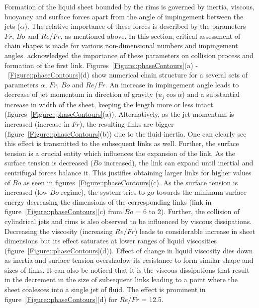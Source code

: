 \documentclass[%
 aip,
 sd,%
amsmath,amssymb,
preprint,%
author-year,%
]{revtex4-1}
\begin{document}
Formation of the liquid sheet bounded by the rims is governed by inertia, viscous, buoyancy and surface forces apart from the angle of impingement between the jets ($\alpha$). {\color{red}The relative importance of these forces is described by the parameters $Fr$, $Bo$ and $Re/Fr$, as mentioned above.} In this section, critical assessment of chain shapes is {\color{red}made} for various non-dimensional numbers and impingement angles. \cite{yang2014liquid} acknowledged the importance {\color{red}of these parameters on collision process and formation of the first link. Figures~\ref{Figure::phaseContours}(a) -~\ref{Figure::phaseContours}(d) show numerical chain structure for a several sets of parameters $\alpha$, $Fr$, $Bo$ and $Re/Fr$.} An increase in impingement angle leads to {\color{red}decrease of} jet momentum in direction of gravity ($u_j\cos\alpha$) {\color{red}and a substantial increase in width of the sheet, keeping the length more or less intact (figures~\ref{Figure::phaseContours}(a)).} Alternatively, as the jet momentum is increased (increase in $Fr$), {\color{red}the resulting links are bigger (figure~\ref{Figure::phaseContours}(b)) due to the fluid inertia.} One can clearly see this effect is transmitted to the subsequent links as well. {\color{red}Further, the surface tension is a crucial entity which influences the expansion of the link}. As the surface tension is decreased ($Bo$ increased), the link can expand until inertial and centrifugal forces balance it. This justifies obtaining larger links for higher values of $Bo$ as seen in figures~\ref{Figure::phaseContours}(c). As the surface tension is increased (low $Bo$ regime), the system tries to go towards the minimum surface energy decreasing the dimensions of the corresponding links (link in figure~\ref{Figure::phaseContours}(c) from $Bo$ = 6 to 2). Further, the collision of cylindrical jets and rims is also observed to be influenced by viscous dissipations. Decreasing the viscosity (increasing $Re/Fr$) leads to considerable increase in sheet dimensions but its effect saturates at lower ranges of liquid viscosities (figure~\ref{Figure::phaseContours}(d)). Effect of change in liquid viscosity dies down as inertia and surface tension overshadow its resistance to form similar shape and sizes of links. It can also be noticed that it is the viscous dissipations that result in the decrement in the size of subsequent links leading to a point where the sheet {\color{red}coalesces into} a single jet of fluid. The effect is prominent in figure~\ref{Figure::phaseContours}(d) for $Re/Fr$ = 12.5.\\
\end{document}
